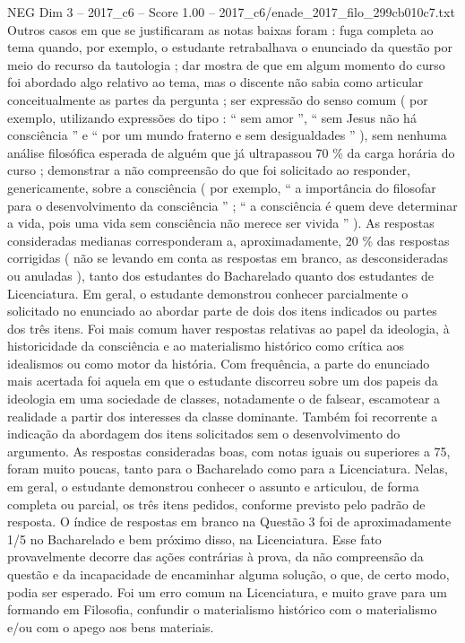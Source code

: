 \begin{textsample}{NEG Dim 3 – 2017\_c6 – Score 1.00 – 2017\_c6/enade\_2017\_filo\_299cb010c7.txt}
Outros casos em que se justificaram as notas baixas foram : fuga completa ao tema quando, por exemplo, o estudante retrabalhava o enunciado da questão por meio do recurso da tautologia ; dar mostra de que em algum momento do curso foi abordado algo relativo ao tema, mas o discente não sabia como articular conceitualmente as partes da pergunta ; ser expressão do senso comum ( por exemplo, utilizando expressões do tipo : “ sem amor ”, “ sem Jesus não há consciência ” e “ por um mundo fraterno e sem desigualdades ” ), sem nenhuma análise filosófica esperada de alguém que já ultrapassou 70 \% da carga horária do curso ; demonstrar a não compreensão do que foi solicitado ao responder, genericamente, sobre a consciência ( por exemplo, “ a importância do filosofar para o desenvolvimento da consciência ” ; “ a consciência é quem deve determinar a vida, pois uma vida sem consciência não merece ser vivida ” ).
As respostas consideradas medianas corresponderam a, aproximadamente, 20 \% das respostas corrigidas ( não se levando em conta as respostas em branco, as desconsideradas ou anuladas ), tanto dos estudantes do Bacharelado quanto dos estudantes de Licenciatura.
Em geral, o estudante demonstrou conhecer parcialmente o solicitado no enunciado ao abordar parte de dois dos itens indicados ou partes dos três itens.
Foi mais comum haver respostas relativas ao papel da ideologia, à historicidade da consciência e ao materialismo histórico como crítica aos idealismos ou como motor da história.
Com frequência, a parte do enunciado mais acertada foi aquela em que o estudante discorreu sobre um dos papeis da ideologia em uma sociedade de classes, notadamente o de falsear, escamotear a realidade a partir dos interesses da classe dominante.
Também foi recorrente a indicação da abordagem dos itens solicitados sem o desenvolvimento do argumento.
As respostas consideradas boas, com notas iguais ou superiores a 75, foram muito poucas, tanto para o Bacharelado como para a Licenciatura.
Nelas, em geral, o estudante demonstrou conhecer o assunto e articulou, de forma completa ou parcial, os três itens pedidos, conforme previsto pelo padrão de resposta.
O índice de respostas em branco na Questão 3 foi de aproximadamente 1/5 no Bacharelado e bem próximo disso, na Licenciatura.
Esse fato provavelmente decorre das ações contrárias à prova, da não compreensão da questão e da incapacidade de encaminhar alguma solução, o que, de certo modo, podia ser esperado.
Foi um erro comum na Licenciatura, e muito grave para um formando em Filosofia, confundir o materialismo histórico com o materialismo e/ou com o apego aos bens materiais.

\end{textsample}
